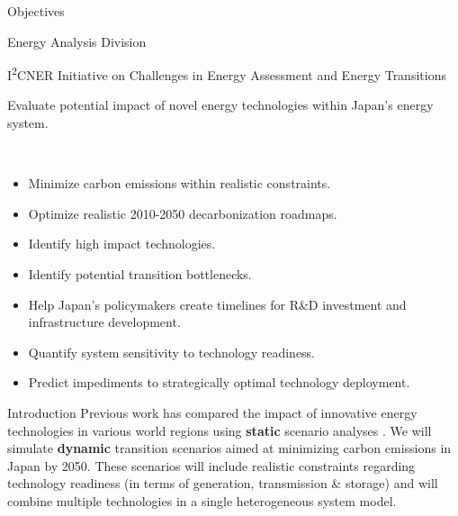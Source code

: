 \documentclass[final]{beamer}
\newlength{\onecolwid}
\newlength{\twocolwid}
\newlength{\threecolwid}
\begin{document}
\begin{frame}[t]
\begin{columns}[t,totalwidth=\threecolwid]
\begin{column}{\twocolwid}
\begin{columns}[t,totalwidth=\twocolwid]
\begin{column}{\onecolwid}
\begin{alertblock}{Objectives}
\begin{description}
{\large 
        \item[\textbf{Division:}] Energy Analysis Division
        \item[\textbf{Project:}] I\textsuperscript{2}CNER Initiative on Challenges in Energy Assessment and Energy Transitions
        \item[\textbf{Objective:}] Evaluate potential impact of novel energy technologies within Japan's energy system.
\item[\textbf{Milestones:}] ~\\}
        \begin{itemize}
        \item Minimize carbon emissions within realistic constraints.
        \item Optimize realistic 2010-2050 decarbonization roadmaps.
	\item Identify high impact technologies.
        \item Identify potential transition bottlenecks.
        \item Help Japan's policymakers create timelines for R\&D investment and infrastructure development.
        \item Quantify system sensitivity to technology readiness.
	\item Predict impediments to strategically optimal technology deployment.
	\end{itemize}
\end{description}

\end{alertblock}
%
%


\begin{block}{Introduction}
Previous work has compared the impact of innovative energy technologies in 
various world regions using \textbf{static} scenario analyses 
\cite{chyong_chi_dynamics_2009,feng_system_2013,kikuchi_simulation-based_2017,li_energy_2010,pambudi_impact_2017,pambudi_future_2016}.  
We will simulate \textbf{dynamic} transition scenarios 
\cite{jebaraj_review_2006,pfenninger_energy_2014} aimed at minimizing carbon 
emissions in Japan by 2050. These scenarios will include realistic constraints 
regarding technology readiness (in terms of generation, transmission \& 
storage) and will combine multiple technologies in a single heterogeneous 
system model.
\end{block}



\end{column}
\end{columns}
\end{column}
\end{columns}
\end{frame}
\end{document}
